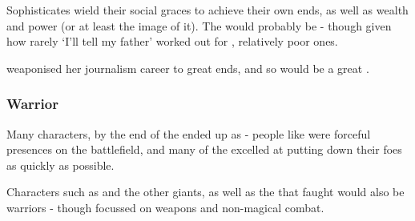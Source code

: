 Sophisticates wield their social graces to achieve their own ends, as well as wealth and power (or at least the image of it). The  would probably be  - though given how rarely `I'll tell my father' worked out for , relatively poor ones. 

 weaponised her journalism career to great ends, and so would be a great .  

\subsubsection{Warrior}

Many characters, by the end of the  ended up as  - people like  were forceful presences on the battlefield, and many of the  excelled at putting down their foes as quickly as possible. 

Characters such as  and the other giants, as well as the  that faught  would also be warriors - though focussed on weapons and non-magical combat. 


